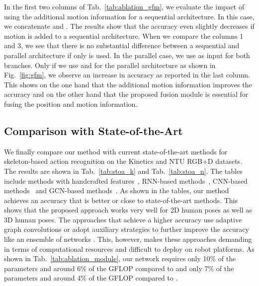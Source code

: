 \documentclass[letterpaper, 10 pt, conference]{ieeeconf}
\begin{document}
In the first two columns of Tab.~\ref{tab:ablation_gfm}, we evaluate the impact of using the additional motion information  for a sequential architecture. In this case, we concatenate  and . The results show that the accuracy even slightly decreases if motion is added to a sequential architecture. When we compare the columns 1 and 3, we see that there is no substantial difference between a sequential and parallel architecture if only  is used. In the parallel case, we use  as input for both branches. Only if we use  and  for the parallel architecture as shown in Fig.~\ref{fig:gfm}, we observe an increase in accuracy as reported in the last column. This shows on the one hand that the additional motion information improves the accuracy and on the other hand that the proposed fusion module is essential for fusing the position and motion information.    
















\subsection{Comparison with State-of-the-Art}


We finally compare our method with current state-of-the-art methods for skeleton-based action recognition on the Kinetics and NTU RGB+D datasets. The results are shown in Tab.~\ref{tab:stoa_k} and Tab.~\ref{tab:stoa_n}.
The tables include methods with handcrafted features~\cite{fernando2015modeling}, RNN-based methods~\cite{shahroudy2016ntu}, CNN-based
methods~\cite{kim2017interpretable,yeh2019chirality} and GCN-based methods~\cite{yan2018spatial,li2019actional,shi2019two}. As shown in the tables, our method achieves an accuracy that is better or close to state-of-the-art methods. This shows that the proposed approach works very well for 2D human poses as well as 3D human poses. The approaches that achieve a higher accuracy use adaptive graph convolutions \cite{li2019actional} or adopt auxiliary strategies to further improve the accuracy like an ensemble of networks \cite{shi2019two}. This, however, makes these approaches demanding in terms of computational resources and difficult to deploy on robot platforms. As shown in Tab.~\ref{tab:ablation_module}, our network requires only 10\% of the parameters and around 6\% of the GFLOP compared to \cite{li2019actional} and only 7\% of the parameters and around 4\% of the GFLOP compared to \cite{shi2019two}. 
\end{document}
